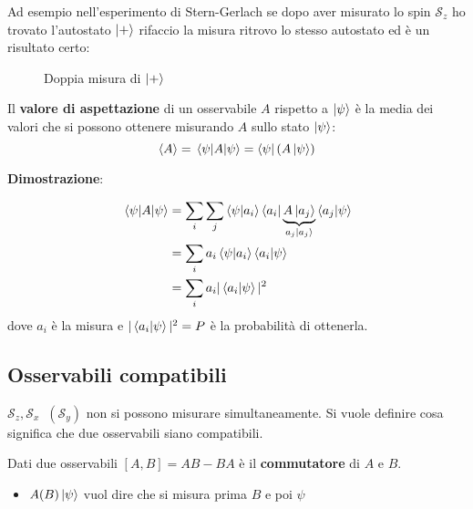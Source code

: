 \documentclass[a4paper]{article}
\begin{document}
\begin{enumerate}
    \vspace{1em}
    \noindent
    Ad esempio nell'esperimento di Stern-Gerlach se dopo aver misurato lo spin \( \mathcal{S}_z \) 
    ho trovato l'autostato \( \ket{+} \) rifaccio la misura ritrovo lo stesso autostato ed
    è un risultato certo:
    \begin{figure}[H]
      \centering
      \caption{Doppia misura di \( \ket{+} \)}
    \end{figure}
\end{enumerate}

\begin{definition}
  Il \textbf{valore di aspettazione} di un osservabile \( A \) rispetto a \( \ket{\psi } \)
  è la media dei valori che si possono ottenere misurando \( A \) sullo stato 
  \( \ket{\psi } \):
  \[
    \expval{A} = \expval{A}{\psi} = \bra{\psi} \left( A \ket{\psi } \right) 
  \]
\end{definition}
\textbf{Dimostrazione}:

\noindent
\[
  \begin{aligned}
    \ev{A}{\psi} &= \sum_i \sum_j \braket{\psi }{a_i} \bra{a_i} \underbrace{A \ket{a_j}}_{a_j \ket{a_j}} 
    \braket{a_j}{\psi }\\
                 &=\sum_i a_i \braket{\psi }{a_i} \braket{a_i}{\psi }\\
                 &=\sum_i a_i |\braket{a_i}{\psi}|^2
  \end{aligned}
\] 
dove \( a_i \) è la misura e \( |\braket{a_i}{\psi}|^2 = P \) è la probabilità di
ottenerla.

\subsection{Osservabili compatibili}
\( \mathcal{S}_z, \mathcal{S}_x \;\; (\mathcal{S}_y) \) non si possono misurare 
simultaneamente. Si vuole definire cosa significa che due osservabili siano compatibili.
\begin{definition}
  Dati due osservabili \( [A,B] = AB - BA \) è il \textbf{commutatore} di \( A \) e \( B \).
  \begin{itemize}
    \item \( A(B) \ket{\psi } \) vuol dire che si misura prima \( B \) e poi \( \psi  \) 
  \end{itemize}
\end{definition}
\end{document}

